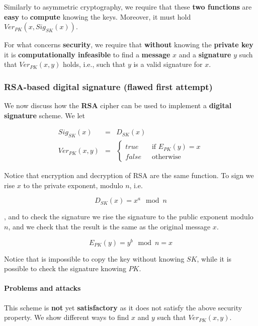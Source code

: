 Similarly to asymmetric cryptography, we require that these \textbf{two functions} are \textbf{easy} to \textbf{compute} knowing the keys. Moreover, it must hold $\mathit{Ver}_{PK}(x,\mathit{Sig}_{SK}(x))$.

For what concerns \textbf{security}, we require that \textbf{without} knowing the \textbf{private key} it is \textbf{computationally infeasible} to find a \textbf{message} $x$ and a \textbf{signature} $y$ such that $\mathit{Ver}_{PK}(x,y)$ holds, i.e., such that $y$ is a valid signature for $x$.

\subsubsection{RSA-based digital signature (flawed first attempt)}
We now discuss how the \textbf{RSA} cipher can be used to implement a \textbf{digital signature} scheme. We let

$$\begin{array}{rcl}\mathit{Sig}_{SK}(x) &= &D_{SK}(x)\\[.3cm] \mathit{Ver}_{PK}(x,y) &=& \left\{ \begin{array}{ll}true ~~~~~ & \mbox{if } E_{PK}(y) = x\\false & \mbox{otherwise}\end{array}\right.\end{array}$$

Notice that encryption and decryption of RSA are the same function. To sign we rise $x$ to the private exponent, modulo $n$, i.e. 

$$
D_{SK}(x) = x^a \mod n
$$ 

, and to check the signature we rise the signature to the public exponent modulo $n$, and we check that the result is the same as the original message $x$.

$$
E_{PK}(y) = y^b \mod n = x
$$

Notice that is impossible to copy the key without knowing $SK$, while it is possible to check the signature knowing $PK$.


\paragraph{Problems and attacks} 
This scheme is \textbf{not} yet \textbf{satisfactory} as it does not satisfy the above security property. We show different ways to find $x$ and $y$ such that $\mathit{Ver}_{PK}(x,y)$.

